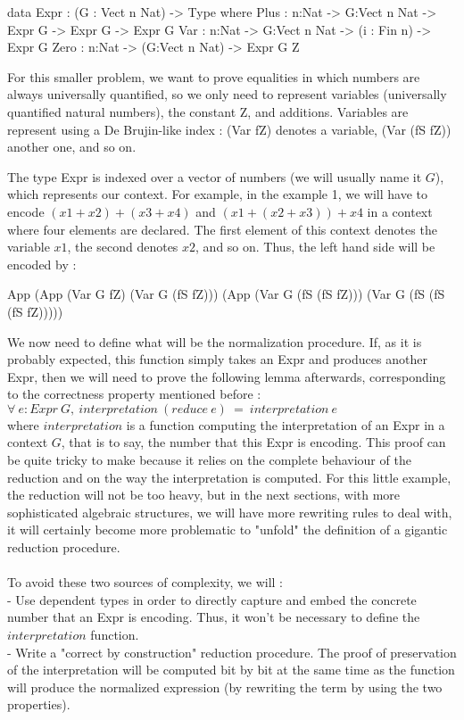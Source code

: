 \documentclass{sigplanconf}
\begin{document}
\begin{code}[caption=First version of reflected numbers, captionpos=b, label=lst1:haskell2]
data Expr : (G : Vect n Nat) -> Type where
     Plus : {n:Nat} -> {G:Vect n Nat} -> 
            Expr G -> Expr G -> Expr G
     Var  : {n:Nat} -> {G:Vect n Nat} -> 
            (i : Fin n) -> Expr G
     Zero : {n:Nat} -> (G:Vect n Nat) -> 
            Expr G Z
\end{code}

For this smaller problem, we want to prove equalities in which numbers are always universally quantified, so we only need to represent variables (universally quantified natural numbers), the constant Z, and additions.
Variables are represent using a De Brujin-like index : (Var fZ) denotes a variable, (Var (fS fZ)) another one, and so on.

The type Expr is indexed over a vector of numbers (we will usually name it $G$), which represents our context. For example, in the example 1, we will have to encode $(x1 + x2) + (x3 + x4)$ and $(x1 + (x2 + x3)) + x4$ in a context where four elements are declared. The first element of this context denotes the variable $x1$, the second denotes $x2$, and so on.
Thus, the left hand side will be encoded by :
\begin{code}[caption=Reflected LHS of example 1, captionpos=b, label=lst1:haskell2]
App (App (Var G fZ) 
         (Var G (fS fZ))) 
    (App (Var G (fS (fS fZ))) 
         (Var G (fS (fS (fS fZ)))))
\end{code}

We now need to define what will be the normalization procedure.
If, as it is probably expected, this function simply takes an Expr and produces another Expr, then we will need to prove the following lemma afterwards, corresponding to the correctness property mentioned before : \\
$\forall\ e:Expr\ G,\ interpretation\ (reduce\ e)\ =\ interpretation\ e$ \\
where $interpretation$ is a function computing the interpretation of an Expr in a context $G$, that is to say, the number that this Expr is encoding.
This proof can be quite tricky to make because it relies on the complete behaviour of the reduction and on the way the interpretation is computed.
For this little example, the reduction will not be too heavy, but in the next sections, with more sophisticated algebraic structures, we will have more rewriting rules to deal with, it will certainly become more problematic to "unfold" the definition of a gigantic reduction procedure. \\
\\
To avoid these two sources of complexity, we will : \\
- Use dependent types in order to directly capture and embed the concrete number that an Expr is encoding. Thus, it won't be necessary to define the $interpretation$ function. \\
- Write a "correct by construction" reduction procedure. The proof of preservation of the interpretation will be computed bit by bit at the same time as the function will produce the normalized expression (by rewriting the term by using the two properties).
\end{document}
